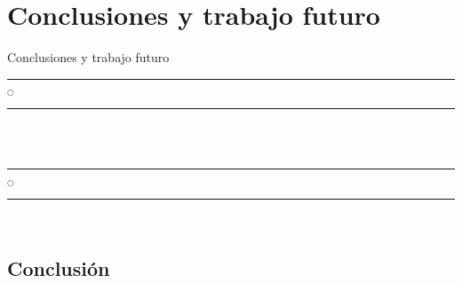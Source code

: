 \chapter[Conclusión]{Conclusiones y trabajo futuro}{Conclusiones y trabajo futuro}\label{Intro}

\noindent
\rule{0.49\textwidth}{0.75pt} $_{\bigcirc}$ \rule{0.49\textwidth}{0.75pt}\\
\lipsum[1]
\lipsum[2]\\
\noindent
\rule{0.49\textwidth}{0.75pt} $_{\bigcirc}$ \rule{0.49\textwidth}{0.75pt}\\
\clearpage

\section{Conclusión}

\lipsum


